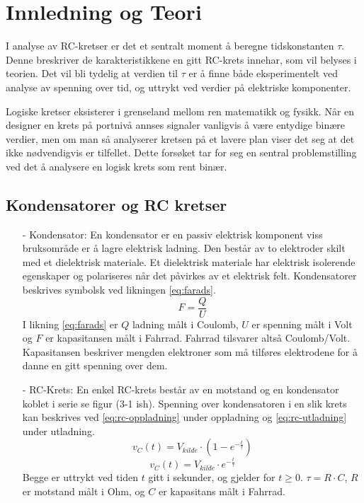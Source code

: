 \section{Innledning og Teori}

I analyse av RC-kretser er det et sentralt moment å beregne tidskonstanten $\tau$.
Denne breskriver de karakteristikkene en gitt RC-krets innehar, som vil belyses i teorien.
Det vil bli tydelig at verdien til $\tau$ er å finne både eksperimentelt ved analyse av spenning over tid, og uttrykt ved verdier på elektriske komponenter.

Logiske kretser eksisterer i grenseland mellom ren matematikk og fysikk.
Når en designer en krets på portnivå annses signaler vanligvis å være entydige binære verdier, men om man så analyserer kretsen på et lavere plan viser det seg at det ikke nødvendigvis er tilfellet.
Dette forsøket tar for seg en sentral problemstilling ved det å analysere en logisk krets som rent binær.

\subsection{Kondensatorer og RC kretser}

    \begin{itemize}
        \item[-] Kondensator: En kondensator er en passiv elektrisk komponent viss bruksområde er å lagre elektrisk ladning.
        Den består av to elektroder skilt med et dielektrisk materiale.
        Et dielektrisk materiale har elektrisk isolerende egenskaper og polariseres når det påvirkes av et elektrisk felt.
        Kondensatorer beskrives symbolsk ved likningen \ref{eq:farads}.
        \begin{equation}
            F = \frac{Q}{U}
            \label{eq:farads}
        \end{equation}
        I likning \ref{eq:farads} er $Q$ ladning målt i Coulomb, $U$ er spenning målt i Volt og $F$ er kapasitansen målt i Fahrrad.
        Fahrrad tilsvarer altså Coulomb/Volt.
        Kapasitansen beskriver mengden elektroner som må tilføres elektrodene for å danne en gitt spenning over dem.
        \item[-] RC-Krets: En enkel RC-krets består av en motstand og en kondensator koblet i serie se figur (3-1 ish).
        Spenning over kondensatoren i en slik krets kan beskrives ved \ref{eq:rc-oppladning} under oppladning og \ref{eq:rc-utladning} under utladning.
        \begin{equation}
            v_{C}(t) = V_{kilde} \cdot \left( 1 - e^{-\frac{t}{\tau}} \right)
            \label{eq:rc-oppladning}
        \end{equation}
        \begin{equation}
            v_{C}(t) = V_{kilde} \cdot e^{-\frac{t}{\tau}}
            \label{eq:rc-utladning}
        \end{equation}
        Begge er uttrykt ved tiden $t$ gitt i sekunder, og gjelder for $t \geq 0$.
        $\tau = R \cdot C$, $R$ er motstand målt i Ohm, og $C$ er kapasitans målt i Fahrrad.
    \end{itemize}

